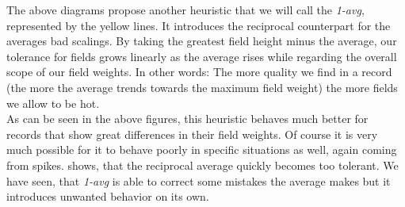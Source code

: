 The above diagrams propose another heuristic that we will call the \textit{1-avg}, represented by the yellow lines. It introduces the reciprocal counterpart for the averages bad scalings. By taking the greatest field height minus the average, our tolerance for fields grows linearly as the average rises while regarding the overall scope of our field weights. In other words: The more quality we find in a record (the more the average trends towards the maximum field weight) the more fields we allow to be hot.\\
As can be seen in the above figures, this heuristic behaves much better for records that show great differences in their field weights. Of course it is very much possible for it to behave poorly in specific situations as well, again coming from spikes.  shows, that the reciprocal average quickly becomes too tolerant. We have seen, that \textit{1-avg} is able to correct some mistakes the average makes but it introduces unwanted behavior on its own.\\

